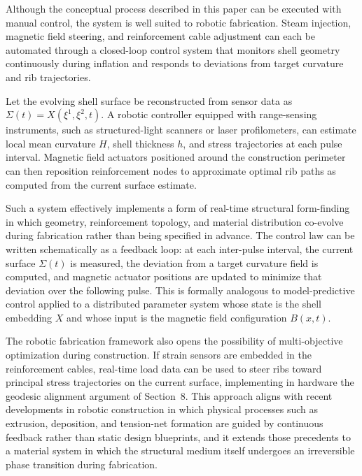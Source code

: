 \documentclass[12pt,a4paper]{article}
\begin{document}
Although the conceptual process described in this paper can be executed
with manual control, the system is well suited to robotic fabrication.
Steam injection, magnetic field steering, and reinforcement cable
adjustment can each be automated through a closed-loop control system
that monitors shell geometry continuously during inflation and responds
to deviations from target curvature and rib trajectories.

Let the evolving shell surface be reconstructed from sensor data as
$\Sigma(t) = X(\xi^1,\xi^2,t)$. A robotic controller equipped with
range-sensing instruments, such as structured-light scanners or laser
profilometers, can estimate local mean curvature $H$, shell thickness
$h$, and stress trajectories at each pulse interval. Magnetic field
actuators positioned around the construction perimeter can then
reposition reinforcement nodes to approximate optimal rib paths as
computed from the current surface estimate.

Such a system effectively implements a form of real-time structural
form-finding in which geometry, reinforcement topology, and material
distribution co-evolve during fabrication rather than being specified
in advance. The control law can be written schematically as a feedback
loop: at each inter-pulse interval, the current surface $\Sigma(t)$ is
measured, the deviation from a target curvature field is computed, and
magnetic actuator positions are updated to minimize that deviation over
the following pulse. This is formally analogous to model-predictive
control applied to a distributed parameter system whose state is the
shell embedding $X$ and whose input is the magnetic field configuration
$B(x,t)$.

The robotic fabrication framework also opens the possibility of
multi-objective optimization during construction. If strain sensors are
embedded in the reinforcement cables, real-time load data can be used
to steer ribs toward principal stress trajectories on the current
surface, implementing in hardware the geodesic alignment argument of
Section~8. This approach aligns with recent developments in robotic
construction in which physical processes such as extrusion, deposition,
and tension-net formation are guided by continuous feedback rather than
static design blueprints, and it extends those precedents to a material
system in which the structural medium itself undergoes an irreversible
phase transition during fabrication.

\end{document}
